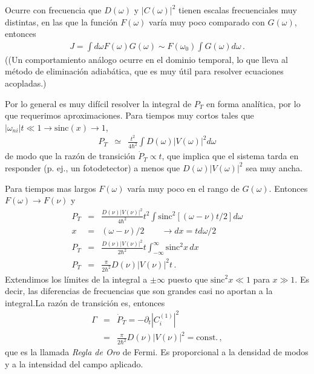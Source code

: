 \documentclass[twocolumn,aps,eqsecnum]{revtex4}
\begin{document}
Ocurre con frecuencia que $D(\omega)$ y $|C(\omega)|^2$ tienen escalas 
frecuenciales muy distintas, en las que la funci\'on $F(\omega)$ var\'ia muy 
poco comparado con $G(\omega)$,  entonces 
%
\begin{eqnarray} 
J = \int d\omega F(\omega) G(\omega) \sim 
	F(\omega_0) \int G(\omega) d\omega \,.
\end{eqnarray}
((Un comportamiento an\'alogo ocurre en el dominio temporal, lo que 
lleva al m\'etodo de eliminaci\'on adiab\'atica, que es muy \'util para 
resolver ecuaciones acopladas.)

Por lo general es muy dif\'icil resolver la integral de $P_T$ en forma 
anal\'itica, por lo que requerimos aproximaciones. Para tiempos muy 
cortos tales que $|\omega_{ni}|  t \ll 1 \to \mathrm{sinc}{(x)} \to 1$, 
%
\begin{eqnarray} 
P_T &\simeq& \frac{t^2}{4\hbar^2} \int D(\omega) |V (\omega)|^2 d\omega 	
\end{eqnarray}
de modo que la raz\'on de transici\'on $\dot{P}_T \propto t$, que implica 
que el sistema tarda en responder (p. ej., un fotodetector) a menos que 
$D(\omega) |V (\omega)|^2$ sea muy ancha. 

Para tiempos mas largos $F(\omega)$ var\'ia muy poco en el rango de 
$G(\omega)$. Entonces $F(\omega) \to F(\nu)$ y 
%
\begin{eqnarray} 
P_T &=& \frac{D(\nu) |V(\nu)|^2}{4\hbar^2} t^2 \int 
	  \mathrm{sinc}^2{[(\omega -\nu) t/2]}  d\omega		\\ 
	x &=& (\omega -\nu)/2 	\qquad \to dx = t d\omega/2 	\\ 
P_T &=& \frac{D(\nu) |V(\nu)|^2}{2\hbar^2} t 
	\int_{-\infty}^{\infty}    \mathrm{sinc}^2{x}  \,dx 	\nonumber \\ 
P_T &=& \frac{\pi}{2\hbar^2} D(\nu) |V(\nu)|^2 t 		\,.
\end{eqnarray}
Extendimos los l\'imites de la integral a $\pm \infty$ puesto que 
$\mathrm{sinc}^2{x} \ll 1$ para $x \gg 1$. Es decir, las diferencias de 
frecuencias que son grandes  casi no aportan a la integral.La raz\'on de 
transici\'on es, entonces 
% 
\begin{eqnarray} 
\Gamma &=& \dot{P}_T = - \partial_t |C_i^{(1)}|^2 	\nonumber \\ 
	&=& \frac{\pi}{2\hbar^2} D(\nu) |V(\nu)|^2 = \mathrm{const.}		\,,
\end{eqnarray}
que es la llamada \textit{Regla de Oro} de Fermi. Es proporcional a la 
densidad de modos y a la intensidad del campo aplicado. 
\end{document}
